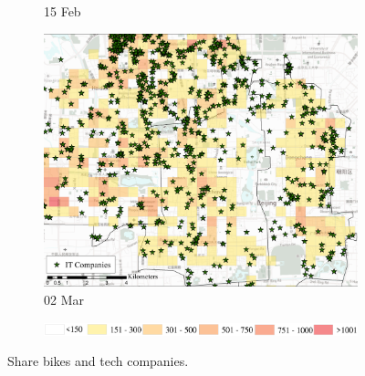 \documentclass[preprints,ijgi,submit,moreauthors]{Definitions/mdpi}
\begin{document}
\begin{figure}[H]
\begin{subfigure}{.32\textwidth}
        \caption{15 Feb}
    \end{subfigure}
    \begin{subfigure}{.32\textwidth}
        \includegraphics[width=\textwidth]{Figures/Relation_with_POIs/POIsITD2020_03_02.pdf}
        \caption{02 Mar}
    \end{subfigure}

    \vspace{6pt}
    \begin{subfigure}{.7\textwidth}
        \includegraphics[width=\textwidth]{Figures/AppendixLegend2.eps}
    \end{subfigure}
    \caption{Share bikes and tech companies.}
    \label{fig:BSS_companies}
\end{figure}





\end{document}
